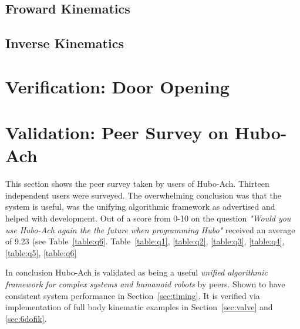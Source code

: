 
	\subsection{Froward Kinematics} 
		
	\subsection{Inverse Kinematics}\label{sec:ik}
			

\section{Verification: Door Opening}\label{sec:hubo-achVerification}
	

\section{Validation: Peer Survey on Hubo-Ach}
	This section shows the peer survey taken by users of Hubo-Ach.
	Thirteen independent users were surveyed.
	The overwhelming conclusion was that the system is useful, was the unifying algorithmic framework as advertised and helped with development.
	Out of a score from 0-10 on the question \textit{"Would you use Hubo-Ach again the the future when programming Hubo"} received an average of 9.23 (see Table~\ref{table:q6}.
	Table~\ref{table:q1}, \ref{table:q2}, \ref{table:q3}, \ref{table:q4}, \ref{table:q5}, \ref{table:q6}

	
	
	
	
	
	

In conclusion Hubo-Ach is validated as being a useful \textit{unified algorithmic framework for complex systems and humanoid robots} by peers.
Shown to have consistent system performance in Section~\ref{sec:timing}.
It is verified via implementation of full body kinematic examples in Section~\ref{sec:valve} and \ref{sec:6dofik}.








